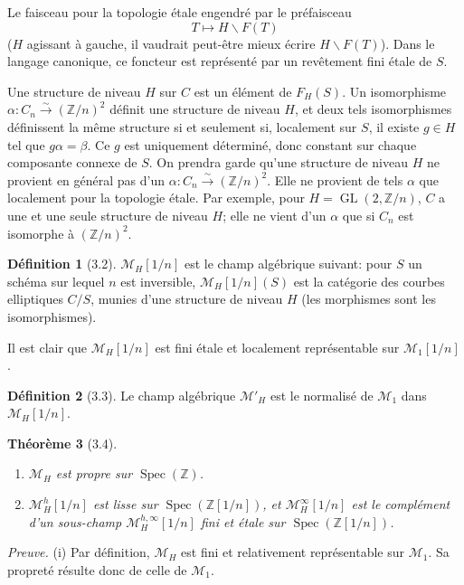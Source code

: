 \documentclass[11pt,a4paper]{amsart}
\theoremstyle{plain}
\newtheorem{theorem}{Th\'eor\`eme}[section]
\theoremstyle{definition}
\newtheorem{definition}[theorem]{D\'efinition}
\DeclareMathOperator{\Spec}{Spec}
\DeclareMathOperator{\Gl}{GL}
\newcommand{\mll}{\mathcal{M}}
\newcommand{\ZZ}{\mathbb{Z}}
\begin{document}
Le faisceau pour la topologie \'etale engendr\'e par le pr\'efaisceau
\[
T \mapsto H \backslash F(T)
\]
($H$ agissant \`a gauche, il vaudrait peut-\^etre mieux \'ecrire $H \backslash F(T)$). Dans le langage canonique, ce foncteur est repr\'esent\'e par un rev\^etement fini \'etale de $S$.

Une structure de niveau $H$ sur $C$ est un \'el\'ement de $F_H(S)$. Un isomorphisme $\alpha \colon C_n \xrightarrow{\sim} (\ZZ/n)^2$ d\'efinit une structure de niveau $H$, et deux tels isomorphismes d\'efinissent la m\^eme structure si et seulement si, localement sur $S$, il existe $g \in H$ tel que $g\alpha = \beta$. Ce $g$ est uniquement d\'etermin\'e, donc constant sur chaque composante connexe de $S$. On prendra garde qu'une structure de niveau $H$ ne provient en g\'en\'eral pas d'un $\alpha \colon C_n \xrightarrow{\sim} (\ZZ/n)^2$. Elle ne provient de tels $\alpha$ que localement pour la topologie \'etale. Par exemple, pour $H = \Gl(2, \ZZ/n)$, $C$ a une et une seule structure de niveau $H$; elle ne vient d'un $\alpha$ que si $C_n$ est isomorphe \`a $(\ZZ/n)^2$.

\begin{definition}[3.2]
$\mll_H[1/n]$ est le champ alg\'ebrique suivant: pour $S$ un sch\'ema sur lequel $n$ est inversible, $\mll_H[1/n](S)$ est la cat\'egorie des courbes elliptiques $C/S$, munies d'une structure de niveau $H$ (les morphismes sont les isomorphismes).
\end{definition}

Il est clair que $\mll_H[1/n]$ est fini \'etale et localement repr\'esentable sur $\mll_1[1/n]$.

\begin{definition}[3.3]
Le champ alg\'ebrique $\mll'_H$ est le normalis\'e de $\mll_1$ dans $\mll_H[1/n]$.
\end{definition}

\begin{theorem}[3.4] \ \begin{enumerate}[label=(\roman*)]
\item $\mll_H$ est propre sur $\Spec(\ZZ)$.
\item $\mll^h_H[1/n]$ est lisse sur $\Spec(\ZZ[1/n])$, et $\mll^{\infty}_H[1/n]$ est le compl\'ement d'un sous-champ $\mll^{h,\infty}_H[1/n]$ fini et \'etale sur $\Spec(\ZZ[1/n])$.
\end{enumerate}
\end{theorem}

\noindent\textit{Preuve.} (i) Par d\'efinition, $\mll_H$ est fini et relativement repr\'esentable sur $\mll_1$. Sa propret\'e r\'esulte donc de celle de $\mll_1$.
\end{document}
